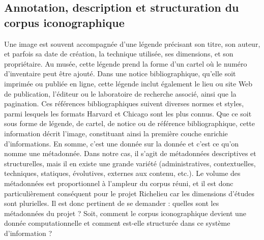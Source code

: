 \subsection{Annotation, description et structuration du corpus iconographique}
Une image est souvent accompagnée d'une légende précisant son titre, son auteur, et parfois sa date de création, la technique utilisée, ses dimensions, et son propriétaire. Au musée, cette légende prend la forme d'un cartel où le numéro d'inventaire peut être ajouté. Dans une notice bibliographique, qu'elle soit imprimée ou publiée en ligne, cette légende inclut également le lieu ou site Web de publication, l'éditeur ou le laboratoire de recherche associé, ainsi que la pagination. Ces références bibliographiques suivent diverses normes et styles, parmi lesquels les formats Harvard et Chicago sont les plus connus. Que ce soit sous forme de légende, de cartel, de notice ou de référence bibliographique, cette information décrit l'image, constituant ainsi la première couche enrichie d'informations. En somme, c'est une donnée sur la donnée et c'est ce qu'on nomme une métadonnée. Dans notre cas, il s'agit de métadonnées descriptives et structurelles, mais il en existe une grande variété (administratives, contextuelles, techniques, statiques, évolutives, externes aux contenu, etc.). Le volume des métadonnées est proportionnel à l'ampleur du corpus réuni, et il est donc particulièrement conséquent pour le projet Richelieu car les dimensions d'études sont plurielles. Il est donc pertinent de se demander : quelles sont les métadonnées du projet ? Soit, comment le corpus iconographique devient une donnée computationnelle et comment est-elle structurée dans ce système d'information ?

